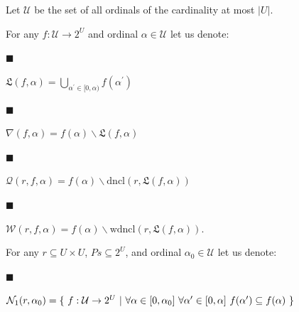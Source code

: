  
 
Let $\mathcal{U}$ be the set of all ordinals of the cardinality at most $|U|$.\par
 
 
 
For any $f:\mathcal{U}\to 2^{U}$ and ordinal $\alpha\in\mathcal{U}$ let us denote:\par
  
\par\noindent  $\blacksquare$ 
 
$\mathfrak{L}(f,\alpha)=\bigcup_{\alpha^{\prime}\in[0,\alpha)}f(\alpha^{\prime})$\par
 
 
 
\par\noindent  $\blacksquare$ 
 
$\nabla(f,\alpha)=f(\alpha)\backslash\mathfrak{L}(f,\alpha)$\par
 
 
 
\par\noindent  $\blacksquare$ 
 
$\mathcal{Q}(r,f,\alpha)=f(\alpha)\backslash\mathrm{dncl}(r,\mathfrak{L}(f,%
\alpha))$\par
 
 
 
\par\noindent  $\blacksquare$ 
 
$\mathcal{W}(r,f,\alpha)=f(\alpha)\backslash\mathrm{wdncl}(r,\mathfrak{L}(f,%
\alpha))$.\par
 
 
  
 
 
For any $r\subseteq U\times U$, $Ps\subseteq 2^{U}$, and ordinal $\alpha_{0}\in\mathcal{U}$ let us denote:\par
  
\par\noindent  $\blacksquare$ 
 
$\mathcal{N}_{1}(r,\alpha_{0})=\{\leavevmode\nobreak\ f:\mathcal{U}\to 2^{U}%
\leavevmode\nobreak\ |\leavevmode\nobreak\ \forall\alpha\in[0,\alpha_{0}]%
\leavevmode\nobreak\ \forall\alpha^{\prime}\in[0,\alpha]\leavevmode\nobreak\ f%
(\alpha^{\prime})\subseteq f(\alpha)\leavevmode\nobreak\ \}$\par
 
